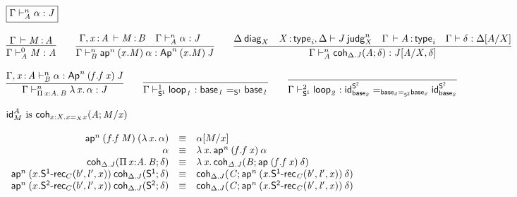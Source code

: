 \begin{small}
\[\begin{array}{l}
\\ \\

\framebox{\ofjudg{\Gamma}{n}{A}{\alpha}{J}} \\ \\

\infer{\ofjudg{\Gamma}{0}{A}{M}{A}} 
      {\oftp{\Gamma}{M}{A}}
\qquad
\infer{\ofjudg{\Gamma}{n}{B}{\apn{n}{(x.M)}{\alpha}}{\Apn{n}{(x.M)}{J}}}
      {\oftp{\Gamma,\tptm{x}{A}}{M}{B} &
       \ofjudg{\Gamma}{n}{A}{\alpha}{J} &
      }
\qquad
\infer{\ofjudg{\Gamma}{n}{A}{\coh{\ctx{\Delta}.J}{A}{\delta}}{\tsubst{J}{A/X,\delta}}}
      {\wfdiag{\Delta}{X} &
       \wfjudg{\tptm{X}{\typ{i}},\Delta}{J}{n}{X} &
       \oftp{\Gamma}{A}{\typ{i}} &
       \wfdsubst{\Gamma}{\delta}{\tsubst{\ctx \Delta}{A/X}}
      }
\\ \\
\infer{\ofjudg{\Gamma}{n}{\picl{x}{A}{B}}{\ulam{x}{\alpha}}{J}}
      {\ofjudg{\Gamma,\tptm{x}{A}}{n}{B}{\alpha}{\Apn{n}{(f.\app{f}{x})}{J}}}
\qquad
\infer{\ofjudg{\Gamma}{1}{\dsd{S^1}}{\lp{1}}{\homj{\dsd{S^1}}{\base{1}}{\base{1}}}}
      {}
\qquad
\infer{\ofjudg{\Gamma}{2}{\dsd{S^1}}{\lp{2}}{\homj{\homj{\dsd{S^2}}{\base{2}}{\base{2}}}{\idt{\dsd{S^2}}{\base{2}}}{\idt{\dsd{S^2}}{\base{2}}}}}
      {}
\\ \\

\text{\idt{A}{M} is \coh{x:X.\homj{X}{x}{x}}{A}{M/x}} \\ \\

\begin{array}{rcl}
\apn{n}{(f.\app f M)}{(\ulam{x}{\alpha})} & \equiv & \tsubst{\alpha}{M/x} \\
\alpha & \equiv & \ulam{x}{\apn{n}{(f.\app f x)}{\alpha}} \\
\coh{\Delta.J}{\picl{x}{A}{B}}{\delta} & \equiv & \ulam{x}{\coh{\Delta.J}{B}{\apn{}{(f.\app f x)}{\delta}}} \\
\apn{n}{(x.\srec{1}{C}{b'}{l'}{x})}{\coh{\ctx \Delta.J}{\dsd{S^1}}{\delta}} & \equiv & 
\coh{\Delta.J}{C}{\apn{n}{(x.\srec{1}{C}{b'}{l'}{x})}{\delta}} \\
\apn{n}{(x.\srec{2}{C}{b'}{l'}{x})}{\coh{\ctx \Delta.J}{\dsd{S^2}}{\delta}} & \equiv & 
\coh{\Delta.J}{C}{\apn{n}{(x.\srec{2}{C}{b'}{l'}{x})}{\delta}} \\
\end{array}
\\ \\


\end{array}\]
\end{small}

